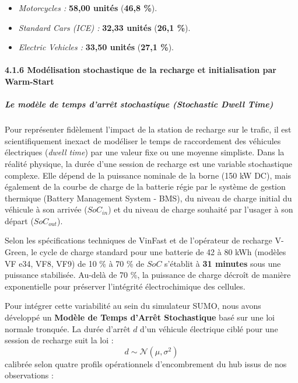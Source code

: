 \documentclass[10pt, a4paper]{article}
\providecommand{\tightlist}{}
\begin{document}
\begin{itemize}
\tightlist
\item
  \emph{Motorcycles :} \textbf{58,00 unités} (\textbf{46,8 \%}).
\item
  \emph{Standard Cars (ICE) :} \textbf{32,33 unités} (\textbf{26,1 \%}).
\item
  \emph{Electric Vehicles :} \textbf{33,50 unités} (\textbf{27,1 \%}).
\end{itemize}

\paragraph{4.1.6 Modélisation stochastique de la recharge et
initialisation par
Warm-Start}\label{moduxe9lisation-stochastique-de-la-recharge-et-initialisation-par-warm-start}

\subparagraph{Le modèle de temps d'arrêt stochastique (Stochastic Dwell
Time)}\label{le-moduxe8le-de-temps-darruxeat-stochastique-stochastic-dwell-time}

Pour représenter fidèlement l'impact de la station de recharge sur le
trafic, il est scientifiquement inexact de modéliser le temps de
raccordement des véhicules électriques (\emph{dwell time}) par une
valeur fixe ou une moyenne simpliste. Dans la réalité physique, la durée
d'une session de recharge est une variable stochastique complexe. Elle
dépend de la puissance nominale de la borne (150 kW DC), mais également
de la courbe de charge de la batterie régie par le système de gestion
thermique (Battery Management System - BMS), du niveau de charge initial
du véhicule à son arrivée (\(SoC_{in}\)) et du niveau de charge souhaité
par l'usager à son départ (\(SoC_{out}\)).

Selon les spécifications techniques de VinFast et de l'opérateur de
recharge V-Green, le cycle de charge standard pour une batterie de 42 à
80 kWh (modèles VF e34, VF8, VF9) de 10 \% à 70 \% de \(SoC\) s'établit
à \textbf{31 minutes} sous une puissance stabilisée. Au-delà de 70 \%,
la puissance de charge décroît de manière exponentielle pour préserver
l'intégrité électrochimique des cellules.

Pour intégrer cette variabilité au sein du simulateur SUMO, nous avons
développé un \textbf{Modèle de Temps d'Arrêt Stochastique} basé sur une
loi normale tronquée. La durée d'arrêt \(d\) d'un véhicule électrique
ciblé pour une session de recharge suit la loi :
\[d \sim \mathcal{N}(\mu, \sigma^2)\] calibrée selon quatre profils
opérationnels d'encombrement du hub issus de nos observations :
\end{document}
